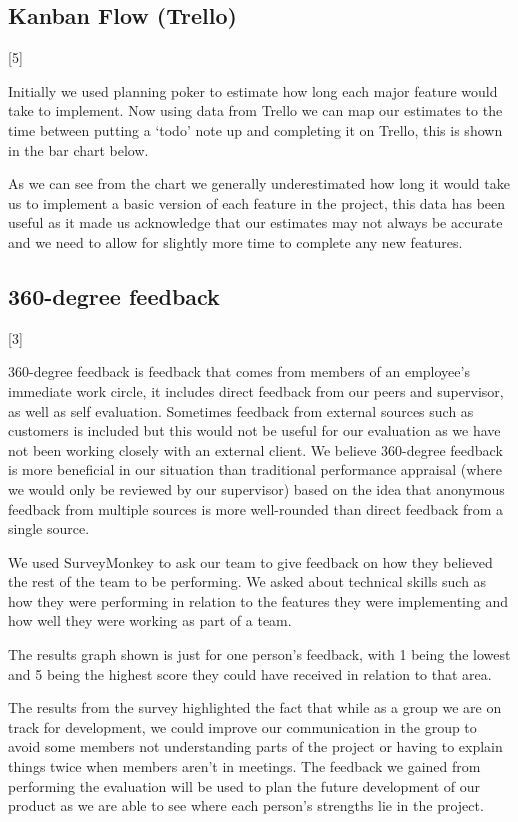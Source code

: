 \documentclass[10pt, a4paper]{article}
\begin{document}
\subsection{Kanban Flow (Trello)}[5]

Initially we used  planning poker to estimate how long each major feature would take to implement. Now using data from Trello we can map our estimates to the time between putting a ‘todo’ note up and completing it on Trello, this is shown in the bar chart below.

As we can see from the chart we generally underestimated how long it would take us to implement a basic version of each feature in the project, this data has been useful as it made us acknowledge that our estimates may not always be accurate and we need to allow for slightly more time to complete any new features.

\subsection{360-degree feedback}[3]

360-degree feedback is feedback that comes from members of an employee's immediate work circle, it includes direct feedback from our peers and supervisor, as well as self evaluation. Sometimes feedback from external sources such as customers is included but this would not be useful for our evaluation as we have not been working closely with an external client. We believe 360-degree feedback is more beneficial in our situation than traditional performance appraisal (where we would only be reviewed by our supervisor) based on the idea that anonymous feedback from multiple sources is more well-rounded than direct feedback from a single source.

We used SurveyMonkey to ask our team to give feedback on how they believed the rest of the team to be performing. We asked about technical skills such as how they were performing in relation to the features they were implementing and how well they were working as part of a team.

The results graph shown is just for one person’s feedback, with 1 being the lowest and 5 being the highest score they could have received in relation to that area.

The results from the survey highlighted the fact that while as a group we are on track for development, we could improve our communication in the group to avoid some members not understanding parts of the project or having to explain things twice when members aren’t in meetings. The feedback we gained from performing the evaluation will be used to plan the future development of our product as we are able to see where each person’s strengths lie in the project.
\end{document}
